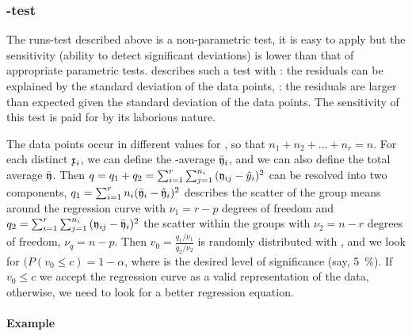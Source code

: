 \begin{refsection}
\subsubsection{-test}

The runs-test described above is a non-parametric test, it is easy to apply but the sensitivity (ability to detect significant deviations) is lower than that of appropriate parametric tests. \parencite[pp. 286--290]{Kre-79} describes such a test with : the residuals can be explained by the standard deviation of the data points,  : the residuals are larger than expected given the standard deviation of the data points. The sensitivity of this test is paid for by its laborious nature.

The  data points occur in  different values for , so that \( n_1 + n_2 + \ldots + n_r = n \). For each distinct \( \mathfrak{x}_i \), we can define the -average \( \bar{\mathfrak{y}}_i \), and we can also define the total average \( \bar{\mathfrak{y}} \). Then \( q  = q_1 + q_2 = \sum_{i=1}^r{\sum_{j=1}^{n_i}{(\mathfrak{y}_{ij} - \hat{y}_i)^2}} \) can be resolved into two components, \( q_1 = \sum_{i=1}^r{n_i (\bar{\mathfrak{y}}_i - \hat{\mathfrak{y}}_i)^2} \) describes the scatter of the group means around the regression curve with \( \nu_1 = r - p \) degrees of freedom and \( q_2 = \sum_{i=1}^r{\sum_{j=1}^{n_i}{(\mathfrak{y}_{ij} - \bar{\mathfrak{y}}_i)^2}} \) the scatter within the groups with \(\nu_2 = n - r \) degrees of freedom, \( \nu_q = n - p\). Then \( v_0 = \frac{q_1/\nu_1}{q_2/\nu_2} \) is randomly distributed with , and we look for \( (P(v_0 \leq c) = 1 - \alpha\), where \skalar{\alpha} is the desired level of significance (say, \SI{5}{\%}). If \( v_0 \leq c \) we accept the regression curve as a valid representation of the data, otherwise, we need to look for a better regression equation.

\paragraph{Example}


\end{refsection}
